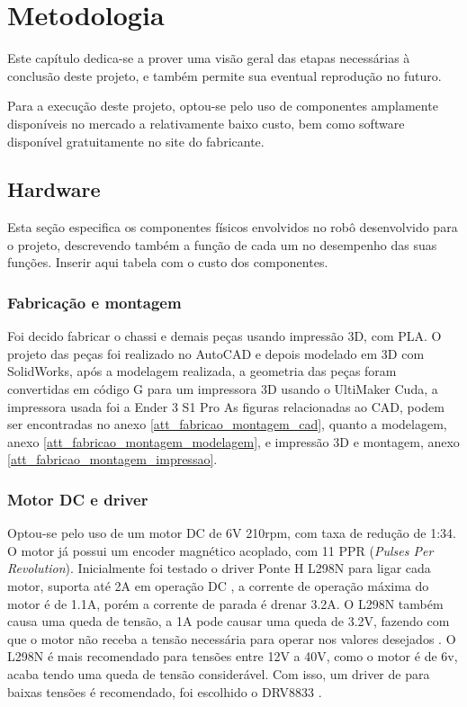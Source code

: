 
\chapter{Metodologia}

{\color{red}Este capítulo dedica-se a prover uma visão geral das etapas necessárias à conclusão deste projeto, e também
permite sua eventual reprodução no futuro.}

Para a execução deste projeto, optou-se pelo uso de componentes amplamente disponíveis no mercado a relativamente baixo
custo, bem como software disponível gratuitamente no site do fabricante.


\section{Hardware}
{\color{red} Esta seção especifica os componentes físicos envolvidos no robô desenvolvido para o projeto, descrevendo
também a função de cada um no desempenho das suas funções.}
{\color{red} Inserir aqui tabela com o custo dos componentes.}

\subsection{Fabricação e montagem}
Foi decido fabricar o chassi e demais peças usando impressão 3D, com PLA.
O projeto das peças foi realizado no AutoCAD e depois modelado em 3D com SolidWorks, após a modelagem realizada,
a geometria das peças foram convertidas em código G para um impressora 3D usando o UltiMaker Cuda, a impressora usada foi a Ender 3 S1 Pro
As figuras relacionadas ao CAD, podem ser encontradas no anexo \ref{att_fabricao_montagem_cad}, quanto a modelagem,
anexo \ref{att_fabricao_montagem_modelagem}, e impressão 3D e montagem, anexo \ref{att_fabricao_montagem_impressao}.



\subsection{Motor DC e driver}
Optou-se pelo uso de um motor DC de 6V 210rpm, com taxa de redução de 1:34. O motor já possui um encoder magnético
acoplado, com 11 PPR (\textit{Pulses Per Revolution}). 
Inicialmente foi testado o driver Ponte H L298N para ligar cada motor, suporta até 2A em operação DC \cite{datasheel_l298n},
a corrente de operação máxima do motor é de 1.1A, porém a corrente de parada é drenar 3.2A. 
O L298N também causa uma queda de tensão, a 1A pode causar uma queda de 3.2V, fazendo com que o
motor não receba a tensão necessária para operar nos valores desejados \cite{datasheel_l298n}. 
O L298N é mais recomendado para tensões entre 12V a 40V, como o motor é de 6v, acaba tendo uma queda de tensão considerável.
Com isso, um driver de para baixas tensões é recomendado, foi escolhido o DRV8833 \cite{datasheel_dvr8833}.

